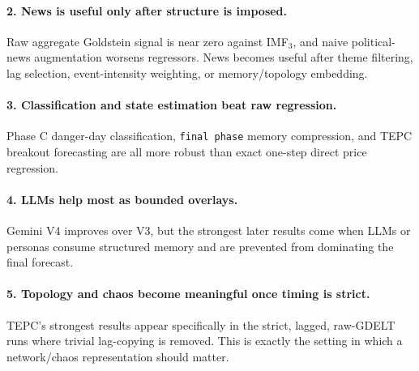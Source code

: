 \documentclass[11pt,a4paper]{article}
\begin{document}
\paragraph{2. News is useful only after structure is imposed.}
Raw aggregate Goldstein signal is near zero against IMF$_3$, and naive political-news augmentation worsens regressors. News becomes useful after theme filtering, lag selection, event-intensity weighting, or memory/topology embedding.

\paragraph{3. Classification and state estimation beat raw regression.}
Phase C danger-day classification, \texttt{final phase} memory compression, and TEPC breakout forecasting are all more robust than exact one-step direct price regression.

\paragraph{4. LLMs help most as bounded overlays.}
Gemini V4 improves over V3, but the strongest later results come when LLMs or personas consume structured memory and are prevented from dominating the final forecast.

\paragraph{5. Topology and chaos become meaningful once timing is strict.}
TEPC's strongest results appear specifically in the strict, lagged, raw-GDELT runs where trivial lag-copying is removed. This is exactly the setting in which a network/chaos representation should matter.
\end{document}
